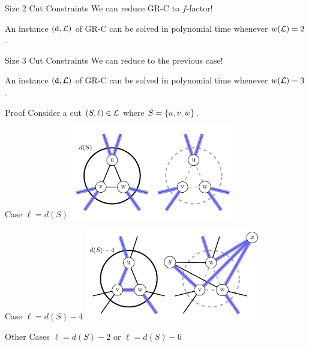 \begin{frame}{Size 2 Cut Constraints}
    \centering
    We can reduce GR-C to $f$-factor!
    \pause
    \bigbreak
    \begin{lemma}[1]
        An instance $(\texttt{d}, \mathcal{L})$ of GR-C can be solved in polynomial time whenever $w(\mathcal{L}) = 2$.
    \end{lemma}
\end{frame}

\begin{frame}{Size 3 Cut Constraints}
    \centering
    We can reduce to the previous case!
    \pause
    \bigbreak
    \begin{theorem}[1]
        An instance $(\texttt{d}, \mathcal{L})$ of GR-C can be solved in polynomial time whenever $w(\mathcal{L}) = 3$.
    \end{theorem}
\end{frame}

\begin{frame}{Proof}
    \centering
    Consider a cut $(S, \ell) \in \mathcal{L}$ where $S = \{u, v, w\}$.
\end{frame}

\begin{frame}{Case $\ell = d(S)$}
    \centering
    \includegraphics[height=4cm]{images/3cut1.png}
\end{frame}

\begin{frame}{Case $\ell = d(S) - 4$}
    \centering
    \includegraphics[height=4cm]{images/3cut4.png}
\end{frame}

\begin{frame}{Other Cases}
    \centering
    \Large
    $\ell = d(S) - 2$ or $\ell = d(S) - 6$
\end{frame}

